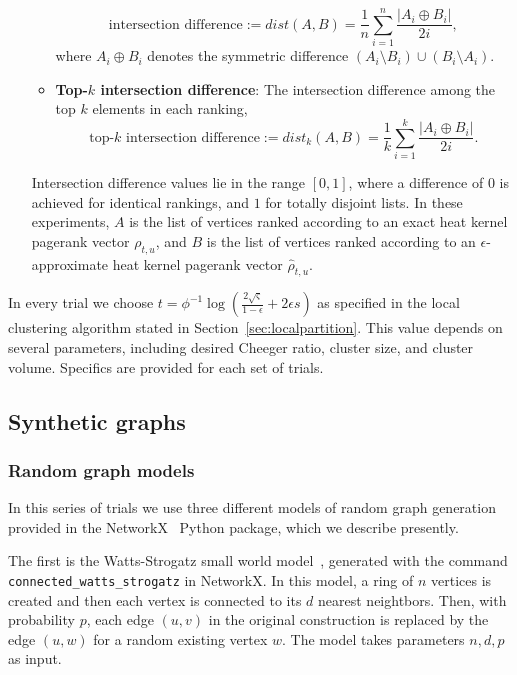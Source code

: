 \documentclass[runningheads,a4paper]{llncs}
\newcommand{\tparamcluster}{\phi^{-1}\log(\frac{2\sqrt{\varsigma}}{1-\epsilon} + 2\epsilon s)}
\begin{document}
\begin{enumerate}
\begin{itemize}
\begin{equation}
  \mbox{intersection difference} := dist(A,B) = \frac{1}{n} \sum\limits_{i=1}^n
\frac{|A_i \oplus B_i|}{2i},
  \end{equation}
  where $A_i \oplus B_i$ denotes the symmetric difference $(A_i \setminus B_i) \cup (B_i
\setminus A_i)$.
  \item \textbf{Top-$k$ intersection difference}: The intersection difference 
among the top $k$ elements in each ranking,
  \begin{equation}\label{eq:measure-isimk}
  \mbox{top-$k$ intersection difference} := dist_k(A,B) = \frac{1}{k}
\sum\limits_{i=1}^k \frac{|A_i \oplus B_i|}{2i}.
  \end{equation}
  \end{itemize}
Intersection difference values lie in the range $[0,1]$, where a difference of
$0$ is achieved for identical rankings, and $1$ for totally disjoint lists.  In
these experiments, $A$ is the list of vertices ranked according to an exact heat
kernel pagerank vector $\rho_{t,u}$, and $B$ is the list of vertices ranked
according to an $\epsilon$-approximate heat kernel pagerank vector $\hat{\rho}_{t,u}$.
\end{enumerate}

In every trial we choose $t=\tparamcluster$ as specified in the local clustering
algorithm stated in Section~\ref{sec:localpartition}.  This value depends on
several parameters, including desired Cheeger ratio, cluster size, and cluster
volume.  Specifics are provided for each set of trials.


\subsection{Synthetic graphs}
\label{sec:synthranking}

\subsubsection{Random graph models}
In this series of trials we use three different models of random graph
generation provided in the NetworkX~\cite{networkx} Python package, which we
describe presently.

The first is the Watts-Strogatz small world model~\cite{wattsstrogatz},
generated with the command \texttt{connected_watts_strogatz} in NetworkX.  In
this model, a ring of $n$ vertices is created and then each vertex is connected
to its $d$ nearest neightbors.  Then, with probability $p$, each edge $(u,v)$ in
the original construction is replaced by the edge $(u,w)$ for a random existing
vertex $w$.  The model takes parameters $n, d, p$ as input.
\end{document}
